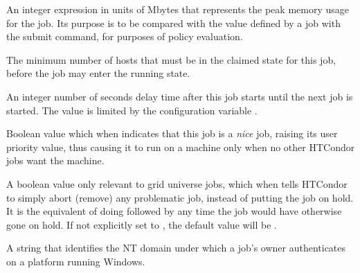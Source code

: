 \begin{description}
\item[\AdAttr{MemoryUsage}:]  An integer expression in units of Mbytes that
represents the peak memory usage for the job.
Its purpose is to be compared with the value defined by a job with the
 submit command,
for purposes of policy evaluation.

\item[\AdAttr{MinHosts}:]  The minimum number of hosts that must be in
the claimed state for this job, before the job may enter the running state.

\item[\AdAttr{NextJobStartDelay}:]  An integer number of seconds delay time
after this job starts until the next job is started. The value is limited
by the configuration variable .

\item[\AdAttr{NiceUser}:]  Boolean value which when  indicates
that this job is a \emph{nice} job, raising its user priority value, 
thus causing it to run on a machine only when no other HTCondor jobs want 
the machine.

\item[\AdAttr{Nonessential}:]  A boolean value only relevant to grid universe
jobs, which when  tells HTCondor to simply abort (remove) 
any problematic job, instead of putting the job on hold.
It is the equivalent of doing  followed by 
  any time the job would have otherwise gone on hold. 
If not explicitly set to , the default value will be .

\item[\AdAttr{NTDomain}:]  A string that identifies the NT domain under
which a job's owner authenticates on a platform running Windows.


\end{description}
